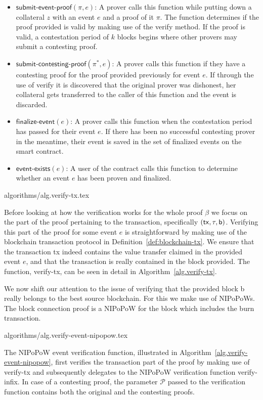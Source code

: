 \begin{itemize}
  \item $\textsf{submit-event-proof}(\pi, e)$: A prover calls this function while putting down a collateral $z$ with an event $e$ and a proof of it $\pi$. The function determines if the proof provided is valid by making use of the \textsf{verify} method. If the proof is valid, a contestation period of $k$ blocks begins where other provers may submit a contesting proof.
  \item $\textsf{submit-contesting-proof}(\pi^*, e)$: A prover calls this function if they have a contesting proof for the proof provided previously for event $e$. If through the use of \textsf{verify} it is discovered that the original prover was dishonest, her collateral gets transferred to the caller of this function and the event is discarded.
  \item $\textsf{finalize-event}(e)$: A prover calls this function when the contestation period has passed for their event $e$. If there has been no successful contesting prover in the meantime, their event is saved in the set of finalized events on the smart contract.
  \item $\textsf{event-exists}(e)$: A user of the contract calls this function to determine whether an event $e$ has been proven and finalized.
\end{itemize}

{algorithms/alg.verify-tx.tex}

Before looking at how the verification works for the whole proof $\beta$ we focus on the part of the proof pertaining to the transaction, specifically $\sf(tx, \tau, b)$. Verifying this part of the proof for some event $e$ is straightforward by making use of the blockchain transaction protocol in Definition~\ref{def:blockchain-tx}. We ensure that the transaction \textsf{tx} indeed contains the value transfer claimed in the provided event $e$, and that the transaction is really contained in the block provided. The function, \textsf{verify-tx}, can be seen in detail in Algorithm~\ref{alg.verify-tx}.

We now shift our attention to the issue of verifying that the provided block \textsf{b} really belongs to the best source blockchain. For this we make use of NIPoPoWs. The block connection proof is a NIPoPoW for the block which includes the burn transaction.

{algorithms/alg.verify-event-nipopow.tex}

The NIPoPoW event verification function, illustrated in Algorithm~\ref{alg.verify-event-nipopow}, first verifies the transaction part of the proof by making use of \textsf{verify-tx} and subsequently delegates to the NIPoPoW verification function \textsf{verify-infix}. In case of a contesting proof, the parameter $\mathcal{P}$ passed to the verification function contains both the original and the contesting proofs.

